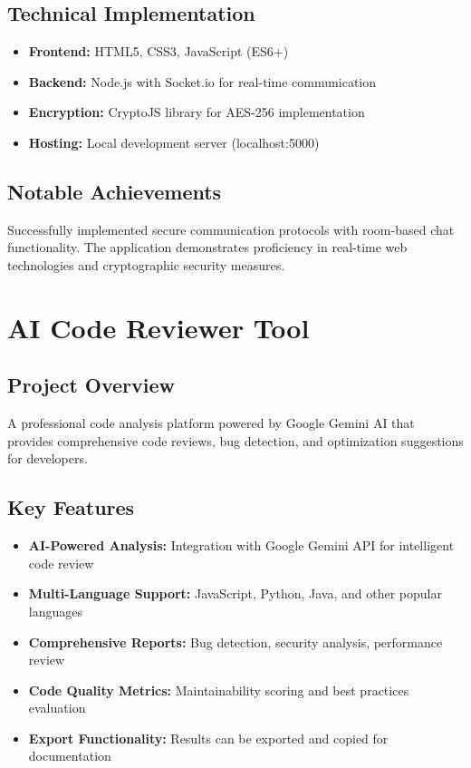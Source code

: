 \documentclass[11pt,a4paper]{article}
\begin{document}
\subsection{Technical Implementation}
\begin{itemize}[leftmargin=1.5cm]
\item \textbf{Frontend:} HTML5, CSS3, JavaScript (ES6+)
\item \textbf{Backend:} Node.js with Socket.io for real-time communication
\item \textbf{Encryption:} CryptoJS library for AES-256 implementation
\item \textbf{Hosting:} Local development server (localhost:5000)
\end{itemize}

\subsection{Notable Achievements}
Successfully implemented secure communication protocols with room-based chat functionality. The application demonstrates proficiency in real-time web technologies and cryptographic security measures.

\newpage

\section{AI Code Reviewer Tool}

\subsection{Project Overview}
A professional code analysis platform powered by Google Gemini AI that provides comprehensive code reviews, bug detection, and optimization suggestions for developers.

\subsection{Key Features}
\begin{itemize}[leftmargin=1.5cm]
\item \textbf{AI-Powered Analysis:} Integration with Google Gemini API for intelligent code review
\item \textbf{Multi-Language Support:} JavaScript, Python, Java, and other popular languages
\item \textbf{Comprehensive Reports:} Bug detection, security analysis, performance review
\item \textbf{Code Quality Metrics:} Maintainability scoring and best practices evaluation
\item \textbf{Export Functionality:} Results can be exported and copied for documentation
\end{itemize}
\end{document}
